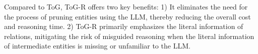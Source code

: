 \documentclass{article} %
\begin{document}








Compared to ToG, ToG-R offers two key benefits: 1) It eliminates the need for the process of pruning entities using the LLM, thereby reducing the overall cost and reasoning time. 2) ToG-R primarily emphasizes the literal information of relations, mitigating the risk of misguided reasoning when the literal information of intermediate entities is missing or unfamiliar to the LLM. 


\end{document}
